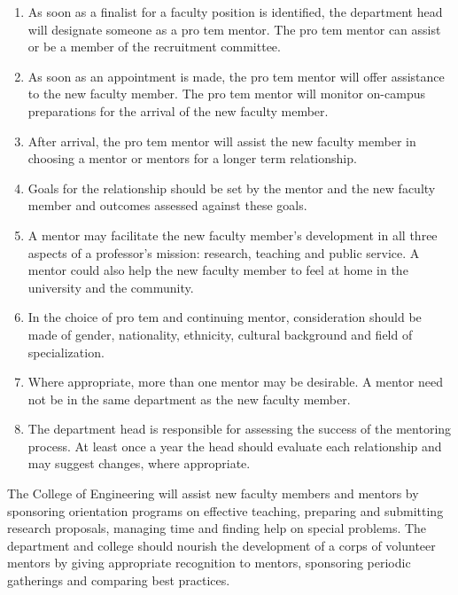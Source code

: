 \begin{enumerate}

\item
 	As soon as a finalist for a faculty position is identified, the
department head will designate someone as a pro tem mentor.  The pro tem
mentor can assist or be a member of the recruitment committee.

\item
 	As soon as an appointment is made, the pro tem mentor will offer
assistance to the new faculty member.  The pro tem mentor will monitor
on-campus preparations for the arrival of the new faculty member.

\item
 	After arrival, the pro tem mentor will assist the new faculty member in
choosing a mentor or mentors for a longer term relationship.

 \item
	Goals for the relationship should be set by the mentor and 
the new faculty member and
outcomes assessed against these goals.

\item
 	A mentor may facilitate the new faculty 
member's development in all three aspects of
a professor's mission:  research, teaching and public service.  A mentor
could also help the new faculty member to feel at home in the university
and the community.

\item
 	In the choice of pro tem and continuing mentor, consideration should be
made of gender, nationality, ethnicity, cultural background and field of
specialization.

 \item
	Where appropriate, more than one mentor may be desirable.  A mentor need
not be in the same department as the new faculty member.

\item
 	The department head is responsible for assessing the success of the
mentoring process.  At least once a year the head should evaluate each
relationship and may suggest changes, where appropriate.

\end{enumerate}

The College of Engineering will assist new faculty members and mentors by
sponsoring orientation programs on effective teaching, preparing and
submitting research proposals, managing time and finding help on special
problems.  The department and college should nourish the development of a
corps of volunteer mentors by giving appropriate recognition to mentors,
sponsoring periodic gatherings and comparing best practices.

